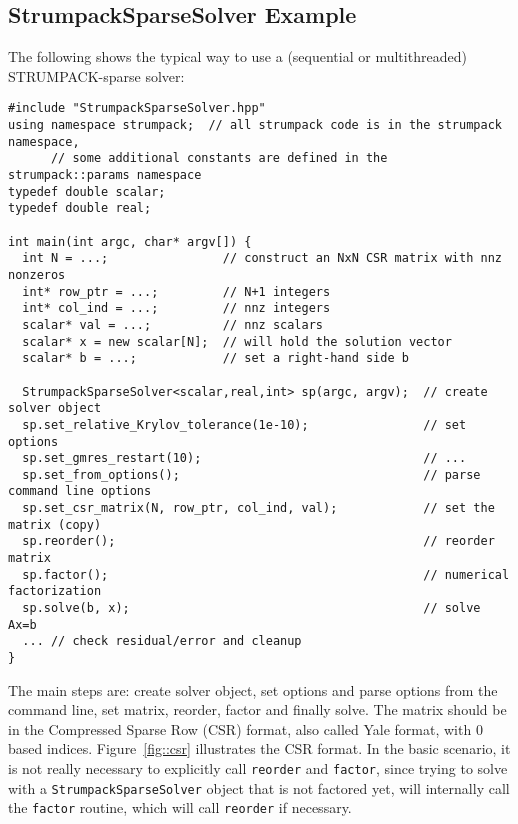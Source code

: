 \documentclass{article}
\begin{document}
\subsection{StrumpackSparseSolver Example}
The following shows the typical way to use a (sequential or
multithreaded) STRUMPACK-sparse solver:
\begin{lstlisting}[style=C]
#include "StrumpackSparseSolver.hpp"
using namespace strumpack;  // all strumpack code is in the strumpack namespace,
      // some additional constants are defined in the strumpack::params namespace
typedef double scalar;
typedef double real;

int main(int argc, char* argv[]) {
  int N = ...;                // construct an NxN CSR matrix with nnz nonzeros
  int* row_ptr = ...;         // N+1 integers
  int* col_ind = ...;         // nnz integers
  scalar* val = ...;          // nnz scalars
  scalar* x = new scalar[N];  // will hold the solution vector
  scalar* b = ...;            // set a right-hand side b

  StrumpackSparseSolver<scalar,real,int> sp(argc, argv);  // create solver object
  sp.set_relative_Krylov_tolerance(1e-10);                // set options
  sp.set_gmres_restart(10);                               // ...
  sp.set_from_options();                                  // parse command line options
  sp.set_csr_matrix(N, row_ptr, col_ind, val);            // set the matrix (copy)
  sp.reorder();                                           // reorder matrix
  sp.factor();                                            // numerical factorization
  sp.solve(b, x);                                         // solve Ax=b
  ... // check residual/error and cleanup
}
\end{lstlisting}
The main steps are: create solver object, set options and parse
options from the command line, set matrix, reorder, factor and finally
solve. The matrix should be in the Compressed Sparse Row (CSR) format,
also called Yale format, with $0$ based indices. Figure~\ref{fig::csr}
illustrates the CSR format. In the basic scenario, it is not really
necessary to explicitly call \lstinline[style=C]!reorder!  and
\lstinline[style=C]!factor!, since trying to solve with a
\lstinline[style=C]!StrumpackSparseSolver!  object that is not
factored yet, will internally call the \lstinline[style=C]!factor!
routine, which will call \lstinline[style=C]!reorder! if necessary.
\end{document}
